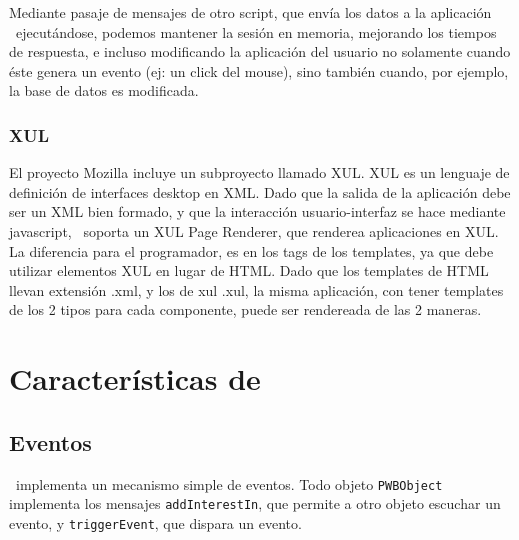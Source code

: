 Mediante pasaje de mensajes de otro script, que envía los datos a la aplicación \PWB \ ejecutándose, podemos mantener la sesión en memoria, mejorando los tiempos de respuesta, e incluso modificando la aplicación del usuario no solamente cuando éste genera un evento (ej: un click del mouse), sino también cuando, por ejemplo, la base de datos es modificada.

\subsubsection{XUL}

El proyecto Mozilla incluye un subproyecto llamado XUL\cite{XUL}. XUL es un lenguaje de definición de interfaces desktop en XML. Dado que la salida de la aplicación debe ser un XML bien formado, y que la interacción usuario-interfaz se hace mediante javascript, \PWB \ soporta un XUL Page Renderer, que renderea aplicaciones en XUL. La diferencia para el programador, es en los tags de los templates, ya que debe utilizar elementos XUL en lugar de HTML. Dado que los templates de HTML llevan extensión .xml, y los de xul .xul, la misma aplicación, con tener templates de los 2 tipos para cada componente, puede ser rendereada de las 2 maneras.

\section{Características de \PITS}






\subsection{Eventos}
\label{sub-events}
\PWB \ implementa un mecanismo simple de eventos. Todo objeto \verb"PWBObject" implementa los mensajes \verb"addInterestIn", que permite a otro objeto escuchar un evento, y \verb"triggerEvent", que dispara un evento.

